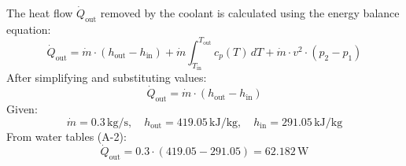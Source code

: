 The heat flow \( \dot{Q}_{\text{out}} \) removed by the coolant is calculated using the energy balance equation:  
\[
\dot{Q}_{\text{out}} = \dot{m} \cdot (h_{\text{out}} - h_{\text{in}}) + \dot{m} \int_{T_{\text{in}}}^{T_{\text{out}}} c_p(T) \, dT + \dot{m} \cdot v^2 \cdot (p_2 - p_1)
\]  
After simplifying and substituting values:  
\[
\dot{Q}_{\text{out}} = \dot{m} \cdot (h_{\text{out}} - h_{\text{in}})
\]  
Given:  
\[
\dot{m} = 0.3 \, \text{kg/s}, \quad h_{\text{out}} = 419.05 \, \text{kJ/kg}, \quad h_{\text{in}} = 291.05 \, \text{kJ/kg}
\]  
From water tables (A-2):  
\[
\dot{Q}_{\text{out}} = 0.3 \cdot (419.05 - 291.05) = 62.182 \, \text{W}
\]